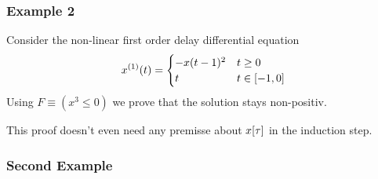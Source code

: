\documentclass[10pt]{report}
\begin{document}
            \subsubsection{Example 2}
                \label{sec:ddi-example-2}
                Consider the non-linear first order delay differential equation
                \begin{equation}
                    \D{x}(t) = \begin{cases}
                         -x(t-1)^2 & t \geq 0\\
                         t & t \in [-1,0]
                    \end{cases}
                \end{equation}
                Using $F\equiv(x^3\leq 0)$ we prove that the solution stays non-positiv.
                \begin{sequentdeduction}
                \end{sequentdeduction}
                This proof doesn't even need any premisse about $x[\tau]$ in the induction step.
            \subsubsection{Second Example}
            \label{sec:second-example}
\end{document}
